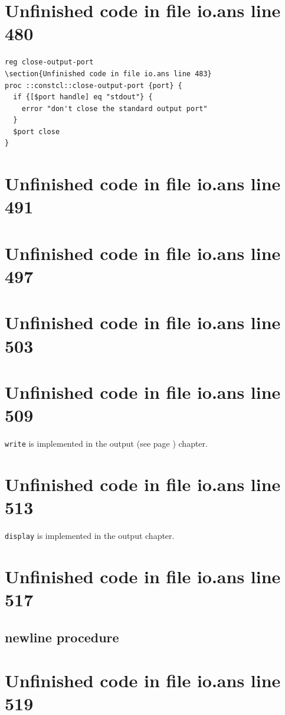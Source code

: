 \documentclass[twoside,9pt]{report}
\begin{document}
\section{Unfinished code in file io.ans line 480}
\begin{lstlisting}
reg close-output-port
\section{Unfinished code in file io.ans line 483}
proc ::constcl::close-output-port {port} {
  if {[$port handle] eq "stdout"} {
    error "don't close the standard output port"
  }
  $port close
}
\end{lstlisting}
\section{Unfinished code in file io.ans line 491}
\section{Unfinished code in file io.ans line 497}
\section{Unfinished code in file io.ans line 503}
\section{Unfinished code in file io.ans line 509}


\texttt{write} is implemented in the output (see page \pageref{output}) chapter.

\section{Unfinished code in file io.ans line 513}


\texttt{display} is implemented in the output chapter.

\section{Unfinished code in file io.ans line 517}
\subsection{newline procedure}
\label{newline-procedure}
\section{Unfinished code in file io.ans line 519}
\end{document}
